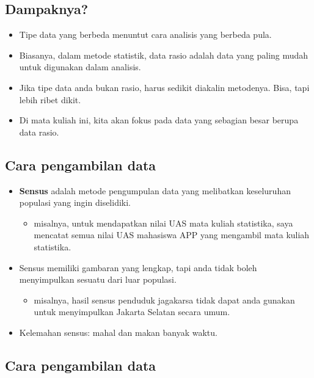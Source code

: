 \documentclass[
  letterpaper,
  DIV=11,
  numbers=noendperiod]{scrartcl}
\providecommand{\tightlist}{%
  \setlength{\itemsep}{0pt}\setlength{\parskip}{0pt}}\usepackage{longtable,booktabs,array}
\begin{document}
\hypertarget{dampaknya}{%
\subsection{Dampaknya?}\label{dampaknya}}

\begin{itemize}
\item
  Tipe data yang berbeda menuntut cara analisis yang berbeda pula.
\item
  Biasanya, dalam metode statistik, data rasio adalah data yang paling
  mudah untuk digunakan dalam analisis.
\item
  Jika tipe data anda bukan rasio, harus sedikit diakalin metodenya.
  Bisa, tapi lebih ribet dikit.
\item
  Di mata kuliah ini, kita akan fokus pada data yang sebagian besar
  berupa data rasio.
\end{itemize}

\hypertarget{cara-pengambilan-data}{%
\subsection{Cara pengambilan data}\label{cara-pengambilan-data}}

\begin{itemize}
\item
  \textbf{Sensus} adalah metode pengumpulan data yang melibatkan
  keseluruhan populasi yang ingin diselidiki.

  \begin{itemize}
  \tightlist
  \item
    misalnya, untuk mendapatkan nilai UAS mata kuliah statistika, saya
    mencatat semua nilai UAS mahasiswa APP yang mengambil mata kuliah
    statistika.
  \end{itemize}
\item
  Sensus memiliki gambaran yang lengkap, tapi anda tidak boleh
  menyimpulkan sesuatu dari luar populasi.

  \begin{itemize}
  \tightlist
  \item
    misalnya, hasil sensus penduduk jagakarsa tidak dapat anda gunakan
    untuk menyimpulkan Jakarta Selatan secara umum.
  \end{itemize}
\item
  Kelemahan sensus: mahal dan makan banyak waktu.
\end{itemize}

\hypertarget{cara-pengambilan-data-1}{%
\subsection{Cara pengambilan data}\label{cara-pengambilan-data-1}}
\end{document}
